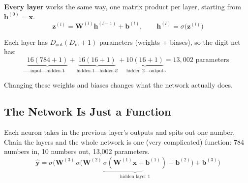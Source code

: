 \begin{keeptogether}
\textbf{Every layer} works the same way, one matrix product per layer, starting from $\mathbf{h}^{(0)} = \mathbf{x}$.
\[
\mathbf{z}^{(l)} = \mathbf{W}^{(l)} \mathbf{h}^{(l-1)} + \mathbf{b}^{(l)},
\qquad
\mathbf{h}^{(l)} = \sigma\big(\mathbf{z}^{(l)}\big)
\]
\end{keeptogether}
Each layer has $D_{\text{out}}(D_{\text{in}} + 1)$ parameters (weights + biases), so the digit net has:
\[
\underbrace{16(784 + 1)}_{\text{input} \to \text{hidden 1}}
+ \underbrace{16(16 + 1)}_{\text{hidden 1} \to \text{hidden 2}}
+ \underbrace{10(16 + 1)}_{\text{hidden 2} \to \text{output}}
= 13{,}002 \text{ parameters}
\]

Changing these weights and biases changes what the network actually does.

\subsection*{The Network Is Just a Function}
\begin{keeptogether}
Each neuron takes in the previous layer's outputs and spits out one number. Chain the layers and the whole network is one (very complicated) function: 784 numbers in, 10 numbers out, 13{,}002 parameters.
\[
\hat{\mathbf{y}} = \sigma\Big(\mathbf{W}^{(3)}\, \sigma\big(\mathbf{W}^{(2)}\, \underbrace{\sigma(\mathbf{W}^{(1)}\mathbf{x} + \mathbf{b}^{(1)})}_{\text{hidden layer 1}} + \mathbf{b}^{(2)}\big) + \mathbf{b}^{(3)}\Big)
\]
\end{keeptogether}

